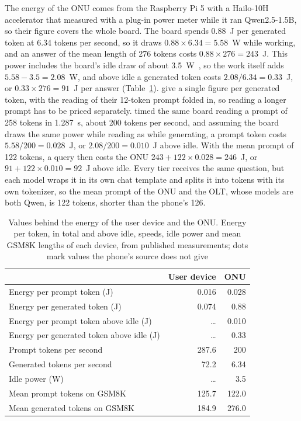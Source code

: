 \documentclass[cic,dipl,english]{infufrgs}
\begin{document}
The energy of the ONU comes from the Raspberry Pi 5 with a Hailo-10H accelerator that
 measured with a plug-in power meter while it ran
Qwen2.5-1.5B, so their figure covers the whole board. The board spends 0.88~J per
generated token at 6.34 tokens per second, so it draws $0.88 \times 6.34 = 5.58$~W while
working, and an answer of the mean length of 276 tokens costs $0.88 \times 276 = 243$~J.
This power includes the board's idle draw of about 3.5~W~\cite{tummalapalli2026edge}, so
the work itself adds $5.58 - 3.5 = 2.08$~W, and above idle a generated token costs
$2.08/6.34 = 0.33$~J, or $0.33 \times 276 = 91$~J per answer (Table~\ref{tab:user-onu}).
 give a single figure per generated token, with the reading
of their 12-token prompt folded in, so reading a longer prompt has to be priced
separately.  timed the same board reading a prompt of
258 tokens in 1.287~s, about 200 tokens per second, and assuming the board draws the same
power while reading as while generating, a prompt token costs $5.58/200 = 0.028$~J, or
$2.08/200 = 0.010$~J above idle. With the mean prompt of 122 tokens, a query then costs
the ONU $243 + 122 \times 0.028 = 246$~J, or $91 + 122 \times 0.010 = 92$~J above idle.
Every tier receives the same question, but each model wraps it in its own chat template and
splits it into tokens with its own tokenizer, so the mean prompt of the ONU and the OLT,
whose models are both Qwen, is 122 tokens, shorter than the phone's 126.

\begin{table}[htb]
  \centering
  \caption[Values behind the energy of the user device and the ONU]{Values behind the energy of the user device and the ONU.
  Energy per token, in total and above idle, speeds, idle power and mean GSM8K lengths of each device, from published measurements; dots mark values the phone's source does not give}
  \label{tab:user-onu}
  \begin{tabular}{lrr}
    \toprule
    & User device & ONU \\
    \midrule
    Energy per prompt token (J) & 0.016 & 0.028 \\
    Energy per generated token (J) & 0.074 & 0.88 \\
    Energy per prompt token above idle (J) & \ldots & 0.010 \\
    Energy per generated token above idle (J) & \ldots & 0.33 \\
    Prompt tokens per second & 287.6 & 200 \\
    Generated tokens per second & 72.2 & 6.34 \\
    Idle power (W) & \ldots & 3.5 \\
    Mean prompt tokens on GSM8K & 125.7 & 122.0 \\
    Mean generated tokens on GSM8K & 184.9 & 276.0 \\
    \bottomrule
  \end{tabular}
\end{table}
\end{document}
